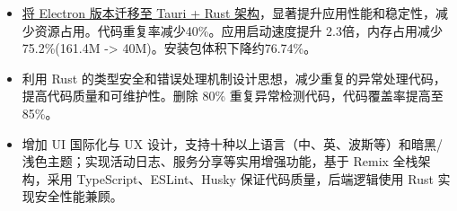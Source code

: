 \documentclass{resume}
\newcommand{\en}[1]{}
\newcommand{\zh}[1]{#1}
\begin{document}
\en{\datedsubsection{\textbf{\href{https://github.com/shaonhuang/V2rayX}{V2rayX (Rust/Tauri 2 Refactor)}}}{}}
\zh{}
\begin{itemize}
    \item \en{\href{\detokenize{https://shaonhuang.vercel.app/posts/v2rayx-refactor}}{Led the migration of V2rayX from Electron to a modern Rust + Tauri architecture}, achieving substantial gains in performance, stability, and resource efficiency. Reduced code duplication by 40\%, improved startup speed by 2.3 times, decreased memory usage by 75.2\% (161.4MB→40MB), and minimized installer size by 76.74\%.}
          \zh{\href{\detokenize{https://shaonhuang.vercel.app/posts/v2rayx-refactor}}{将 Electron 版本迁移至 Tauri + Rust 架构}，显著提升应用性能和稳定性，减少资源占用。代码重复率减少40\%。应用启动速度提升 2.3倍，内存占用减少 75.2\%(161.4M -> 40M)。安装包体积下降约76.74\%。}
    \item \en{Applied advanced Rust paradigms for type safety and error handling, eliminating 80\% of redundant exception logic and increasing code coverage to 85\%, resulting in a highly robust and maintainable codebase.}
          \zh{利用 Rust 的类型安全和错误处理机制设计思想，减少重复的异常处理代码，提高代码质量和可维护性。删除 80\% 重复异常检测代码，代码覆盖率提高至 85\%。}
    \item \en{Implemented comprehensive UI internationalization (supporting over 10 languages, including Chinese, English, Persian, etc.) and major UX enhancements, such as dark/light themes, activity logging, and service sharing. Built on a full-stack Remix architecture with TypeScript, ESLint, and Husky for code quality, and Rust for secure and high-performance backend logic.}
          \zh{增加 UI 国际化与 UX 设计，支持十种以上语言（中、英、波斯等）和暗黑/浅色主题；实现活动日志、服务分享等实用增强功能，基于 Remix 全栈架构，采用 TypeScript、ESLint、Husky 保证代码质量，后端逻辑使用 Rust 实现安全性能兼顾。}
\end{itemize}
\end{document}
